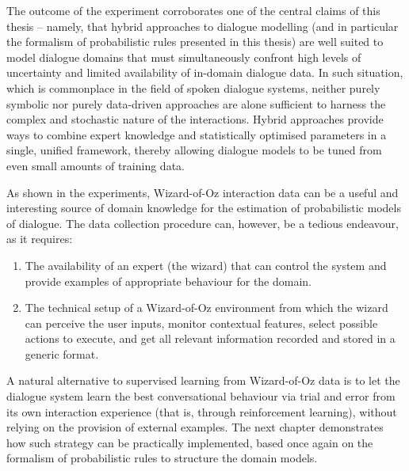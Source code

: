 The outcome of the experiment corroborates one of the central claims of this thesis -- namely, that hybrid approaches to dialogue modelling (and in particular the formalism of probabilistic rules presented in this thesis) are well suited to model dialogue domains that must simultaneously confront high levels of uncertainty and limited availability of in-domain dialogue data. In such situation, which is commonplace in the field of spoken dialogue systems, neither purely symbolic nor purely data-driven approaches are alone sufficient to harness the complex and stochastic nature of the interactions.  Hybrid approaches provide ways to combine expert knowledge and statistically optimised parameters in a single, unified framework, thereby allowing dialogue models to be tuned from even small amounts of training data. 

As shown in the experiments, Wizard-of-Oz interaction data can be a useful and interesting source of domain knowledge for the estimation of probabilistic models of dialogue. The data collection procedure can, however, be a tedious endeavour, as it requires:
\begin{enumerate}
\item The availability of an expert (the wizard) that can control the system and provide examples of appropriate behaviour for the domain.
\item The technical setup of a Wizard-of-Oz environment from which the wizard can perceive the user inputs, monitor contextual features, select possible actions to execute, and get all relevant information recorded and stored in a generic format. 
\end{enumerate}

A natural alternative to supervised learning from Wizard-of-Oz data is to let the dialogue system learn the best conversational behaviour via trial and error from its own interaction experience (that is, through reinforcement learning), without relying on the provision of external examples.  The next chapter demonstrates how such strategy can be practically implemented, based once again on the formalism of probabilistic rules to structure the domain models. 
